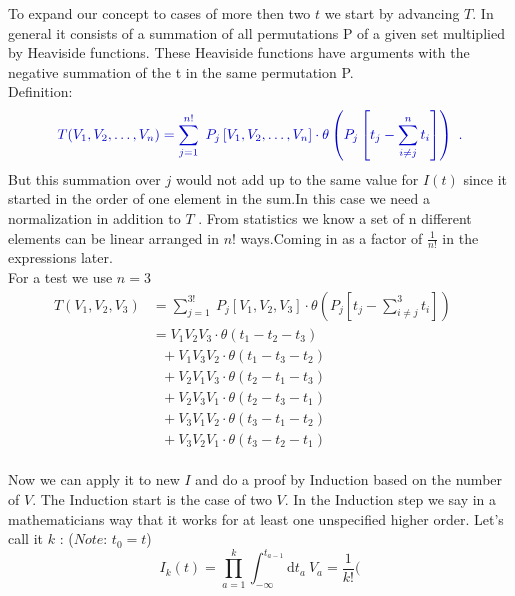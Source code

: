 \documentclass[12pt, titlepage]{article}
\begin{document}
\begin{appendices}
To expand our concept to cases of more then  two $  t $ we start by advancing $ T $.
In general it consists of a summation of all permutations P of a given set multiplied by Heaviside functions. These Heaviside functions have arguments with the negative summation of the t in the same permutation P.\\
Definition:
\begin{equation}\textcolor[RGB]{0,0,204}{
T(V_1, V_2,\ldots,V_n)=
\sum_{j=1}^{n!}\ P_{j}
\left[
V_1, V_2,\ldots,V_n
 \right]  
\cdot
\theta \left(P_{j}\left[t_{j} -\sum_{i\neq j}^{n} t_{i}\right]\right)\ .
}
\end{equation}
But this summation over $ j $ would not add up to the same value for $ I(t) $ since it started in the order of one element in the sum.In this case we need a normalization in addition to $ T $ . From statistics we know a set of n different elements can be linear arranged in $ n! $ ways.Coming in as a factor of $ \frac{1}{n!} $ in the expressions later.
\\
For a test we use $ n=3 $
\begin{subequations}
\begin{align}
T(V_1, V_2,V_3)
&=
\sum_{j=1}^{3!}\ P_{j}
\left[
V_1, V_2,V_3
 \right]  
\cdot
\theta \left(P_{j}\left[t_{j} -\sum_{i\neq j}^{3} t_{i}\right]\right)\
&\\
&=V_{1}V_{2}V_{3}\cdot \theta(t_{1}-t_{2}-t_{3})
	&\\
	& \ \ \ +V_{1}V_{3}V_{2} \cdot \theta(t_{1}-t_{3}-t_{2})
	&\\
	& \ \ \ +V_{2}V_{1}V_{3} \cdot \theta(t_{2}-t_{1}-t_{3})
	&\\
	& \ \ \ +V_{2}V_{3}V_{1} \cdot \theta(t_{2}-t_{3}-t_{1})
	&\\
	& \ \ \ +V_{3}V_{1}V_{2} \cdot \theta(t_{3}-t_{1}-t_{2})
	&\\
	& \ \ \ +V_{3}V_{2}V_{1} \cdot \theta(t_{3}-t_{2}-t_{1})
\end{align}
\end{subequations}
\\
Now we can apply it to new $ I $ and do a proof by Induction based on the number of $ V $. The Induction start is the case of two $ V $. In the Induction step we say in a mathematicians way that it works for at least one unspecified higher order. Let's call it $ k $ : ($ \textit{Note:} $ $ t_0 = t $)\\
\begin{equation}
I_k (t)
=
 \prod_{a=1}^{k} 
 \int_{-\infty}^{t_{a-1}}\mathrm{d}t_a\
  V_a
=
\dfrac{1}{k!}
 (

\end{equation}
\end{appendices}
\end{document}
